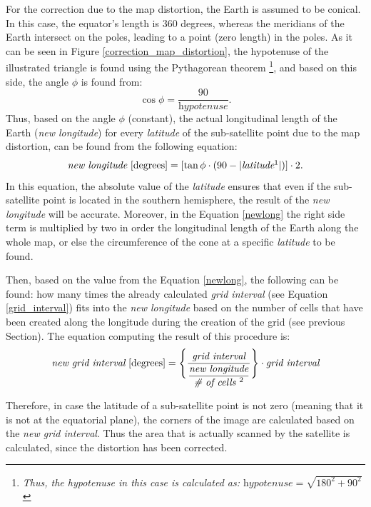 For the correction due to the map distortion, the Earth is assumed to be conical. In this case, the equator's length is 360 degrees, whereas the meridians of the Earth intersect on the poles, leading to a point (zero length) in the poles. As it can be seen in Figure \ref{correction_map_distortion}, the hypotenuse of the illustrated triangle is found using the Pythagorean theorem \footnote{\label{Pythagorean}\textit{Thus, the hypotenuse in this case is calculated as: $\textit{hypotenuse} = \sqrt{180^{2} + 90^{2}}$}}, and based on this side, the angle $\phi$ is found from: $$ \cos{\phi} = \frac{90}{\textit{hypotenuse}}.$$
Thus, based on the angle $\phi$ (constant), the actual longitudinal length of the Earth (\textit{new longitude}) for every \textit{latitude} of the sub-satellite point due to the map distortion, can be found from the following equation:
\begin{equation}
\label{newlong}
\textit{new longitude} \text{ [degrees]} = \left[ \tan\phi \cdot (90 - \lvert \textit{latitude} \footnotemark \rvert) \right] \cdot 2.
\end{equation}In this equation, the absolute value of the \textit{latitude} ensures that even if the sub-satellite point is located in the southern hemisphere, the result of the \textit{new longitude} will be accurate. Moreover, in the Equation \ref{newlong} the right side term is multiplied by two in order the longitudinal length of the Earth along the whole map, or else the circumference of the cone at a specific \textit{latitude} to be found.

Then, based on the value from the Equation \ref{newlong}, the following can be found: how many times the already calculated \textit{grid interval} (see Equation \ref{grid_interval}) fits into the \textit{new longitude} based on the number of cells that have been created along the longitude during the creation of the grid (see previous Section). The equation computing the result of this procedure is:
$$ \textit{new grid interval} \text{ [degrees]} = \Bigg \{ \dfrac{\textit{grid interval}}{\dfrac{\textit{new longitude}}{\textit{\# of cells \footnotemark}}} \Bigg \} \cdot \textit{grid interval} $$

Therefore, in case the latitude of a sub-satellite point is not zero (meaning that it is not at the equatorial plane), the corners of the image are calculated based on the \textit{new grid interval}. Thus the area that is actually scanned by the satellite is calculated, since the distortion has been corrected.


